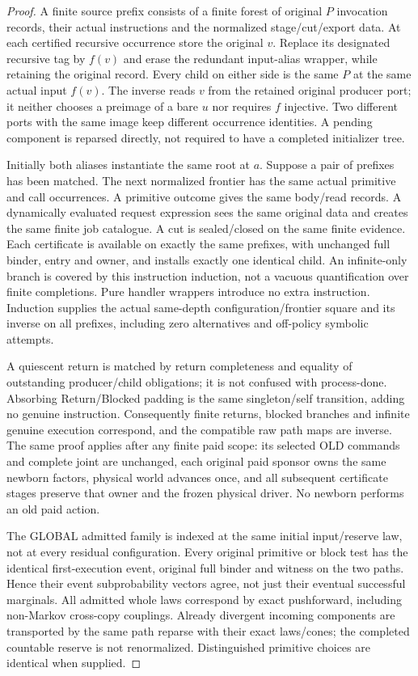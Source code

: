 \documentclass[11pt]{article}
\begin{document}
\begin{proof}
A finite source prefix consists of a finite forest of original $P$ invocation records, their actual instructions and the normalized stage/cut/export data. At each certified recursive occurrence store the original $v$. Replace its designated recursive tag by $f(v)$ and erase the redundant input-alias wrapper, while retaining the original record. Every child on either side is the same $P$ at the same actual input $f(v)$. The inverse reads $v$ from the retained original producer port; it neither chooses a preimage of a bare $u$ nor requires $f$ injective. Two different ports with the same image keep different occurrence identities. A pending component is reparsed directly, not required to have a completed initializer tree.

Initially both aliases instantiate the same root at $a$. Suppose a pair of prefixes has been matched. The next normalized frontier has the same actual primitive and call occurrences. A primitive outcome gives the same body/read records. A dynamically evaluated request expression sees the same original data and creates the same finite job catalogue. A cut is sealed/closed on the same finite evidence. Each certificate is available on exactly the same prefixes, with unchanged full binder, entry and owner, and installs exactly one identical child. An infinite-only branch is covered by this instruction induction, not a vacuous quantification over finite completions. Pure handler wrappers introduce no extra instruction. Induction supplies the actual same-depth configuration/frontier square and its inverse on all prefixes, including zero alternatives and off-policy symbolic attempts.

A quiescent return is matched by return completeness and equality of outstanding producer/child obligations; it is not confused with process-done. Absorbing Return/Blocked padding is the same singleton/self transition, adding no genuine instruction. Consequently finite returns, blocked branches and infinite genuine execution correspond, and the compatible raw path maps are inverse. The same proof applies after any finite paid scope: its selected OLD commands and complete joint are unchanged, each original paid sponsor owns the same newborn factors, physical world advances once, and all subsequent certificate stages preserve that owner and the frozen physical driver. No newborn performs an old paid action.

The GLOBAL admitted family is indexed at the same initial input/reserve law, not at every residual configuration. Every original primitive or block test has the identical first-execution event, original full binder and witness on the two paths. Hence their event subprobability vectors agree, not just their eventual successful marginals. All admitted whole laws correspond by exact pushforward, including non-Markov cross-copy couplings. Already divergent incoming components are transported by the same path reparse with their exact laws/cones; the completed countable reserve is not renormalized. Distinguished primitive choices are identical when supplied.


\end{proof}
\end{document}
